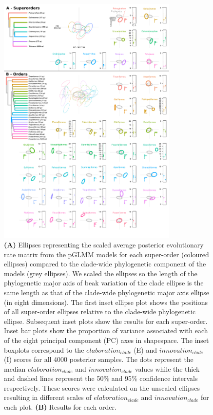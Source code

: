 \documentclass[12pt,a4paper]{article}
\begin{document}
\begin{figure}[H]
\centering
   \includegraphics[width=0.8\textwidth]{Figures/ellipses_supplementary.pdf}
\caption{\scriptsize{\textbf{(A)} Ellipses representing the scaled average posterior evolutionary rate matrix from the pGLMM models for each super-order (coloured ellipses) compared to the clade-wide phylogenetic component of the models (grey ellipses).
We scaled the ellipses so the length of the phylogenetic major axis of beak variation of the clade ellipse is the same length as that of the clade-wide phylogenetic major axis ellipse (in eight dimensions).
The first inset ellipse plot shows the positions of all super-order ellipses relative to the clade-wide phylogenetic ellipse.
Subsequent inset plots show the results for each super-order. 
Inset bar plots show the proportion of variance associated with each of the eight principal component (PC) axes in shapespace.
The inset boxplots correspond to the $elaboration_{clade}$ (E) and $innovation_{clade}$ (I) scores for all 4000 posterior samples.
The dots represent the median $elaboration_{clade}$ and $innovation_{clade}$ values while the thick and dashed lines represent the 50\% and 95\% confidence intervals respectively.
These scores were calculated on the unscaled ellipses resulting in different scales of $elaboration_{clade}$ and $innovation_{clade}$ for each plot.
\textbf{(B)} Results for each order.}}
\label{Fig:ellipses_rainbow}
\end{figure}
\end{document}

